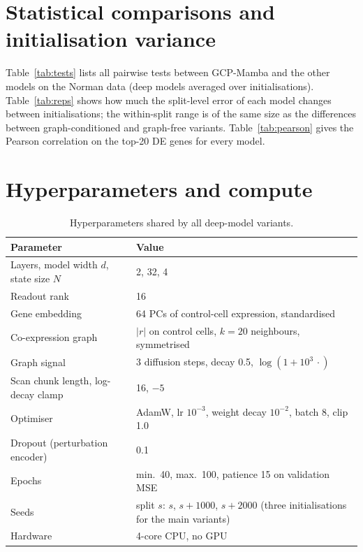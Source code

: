 \documentclass[10pt]{article}
\begin{document}
\section{Statistical comparisons and initialisation variance}
Table~\ref{tab:tests} lists all pairwise tests between GCP-Mamba and the other models on the Norman
data (deep models averaged over initialisations). Table~\ref{tab:reps} shows how much the split-level
error of each model changes between initialisations; the within-split range is of the same size as
the differences between graph-conditioned and graph-free variants. Table~\ref{tab:pearson} gives the
Pearson correlation on the top-20 DE genes for every model.







\section{Hyperparameters and compute}
\begin{table}[h]
\caption{Hyperparameters shared by all deep-model variants.}\label{tab:hyper}
\centering\small
\begin{tabular}{ll}
\toprule
Parameter & Value\\
\midrule
Layers, model width $d$, state size $N$ & 2, 32, 4\\
Readout rank & 16\\
Gene embedding & 64 PCs of control-cell expression, standardised\\
Co-expression graph & $|r|$ on control cells, $k=20$ neighbours, symmetrised\\
Graph signal & 3 diffusion steps, decay 0.5, $\log(1+10^3\,\cdot)$\\
Scan chunk length, log-decay clamp & 16, $-5$\\
Optimiser & AdamW, lr $10^{-3}$, weight decay $10^{-2}$, batch 8, clip 1.0\\
Dropout (perturbation encoder) & 0.1\\
Epochs & min.\ 40, max.\ 100, patience 15 on validation MSE\\
Seeds & split $s$: $s$, $s+1000$, $s+2000$ (three initialisations for the main variants)\\
Hardware & 4-core CPU, no GPU\\
\bottomrule
\end{tabular}
\end{table}
\end{document}
